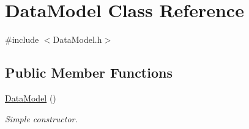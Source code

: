 \hypertarget{classDataModel}{
\section{DataModel Class Reference}
\label{classDataModel}
}


{\ttfamily \#include $<$DataModel.h$>$}\subsection*{Public Member Functions}
\begin{DoxyCompactItemize}
\item 
\hypertarget{classDataModel_abff03aef2cb531142a35781bb87c3365}{
\hyperlink{classDataModel_abff03aef2cb531142a35781bb87c3365}{DataModel} ()}
\label{classDataModel_abff03aef2cb531142a35781bb87c3365}

\begin{DoxyCompactList}\small\item\em Simple constructor. \item\end{DoxyCompactList}\end{DoxyCompactItemize}
